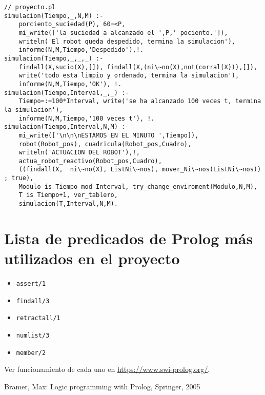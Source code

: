 \documentclass{llncs}
\begin{document}
\begin{lstlisting}
// proyecto.pl
simulacion(Tiempo,_,N,M) :- 
    porciento_suciedad(P), 60=<P,
    mi_write(['la suciedad a alcanzado el ',P,' pociento.']),
    writeln('El robot queda despedido, termina la simulacion'),
    informe(N,M,Tiempo,'Despedido'),!.
simulacion(Tiempo,_,_,_) :-
    findall(X,sucio(X),[]), findall(X,(ni\~no(X),not(corral(X))),[]),
    write('todo esta limpio y ordenado, termina la simulacion'),
    informe(N,M,Tiempo,'OK'), !.
simulacion(Tiempo,Interval,_,_) :-
    Tiempo=:=100*Interval, write('se ha alcanzado 100 veces t, termina la simulacion'), 
    informe(N,M,Tiempo,'100 veces t'), !.
simulacion(Tiempo,Interval,N,M) :-
    mi_write(['\n\n\nESTAMOS EN EL MINUTO ',Tiempo]),
    robot(Robot_pos), cuadricula(Robot_pos,Cuadro),
    writeln('ACTUACION DEL ROBOT'),!,
    actua_robot_reactivo(Robot_pos,Cuadro),
    ((findall(X,  ni\~no(X), ListNi\~nos), mover_Ni\~nos(ListNi\~nos)) ; true),   
    Modulo is Tiempo mod Interval, try_change_enviroment(Modulo,N,M),
    T is Tiempo+1, ver_tablero,
    simulacion(T,Interval,N,M).
\end{lstlisting}


\section{Lista de predicados de Prolog m\'as utilizados en el proyecto}

\begin{itemize}
\item \texttt{assert/1}
\item \texttt{findall/3}
\item \texttt{retractall/1}
\item \texttt{numlist/3}
\item \texttt{member/2}
\end{itemize}

Ver funcionamiento de cada uno en \url{https://www.swi-prolog.org/}.

\begin{thebibliography}{5}  

	Bramer, Max:
	Logic programming with Prolog,
	Springer, 
	2005
\end{thebibliography}
\end{document}

